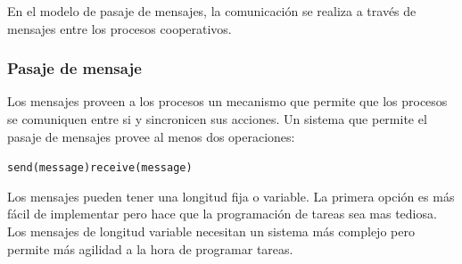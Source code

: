 En el modelo de pasaje de mensajes, la comunicación se realiza a través de mensajes entre los procesos cooperativos.

\subsubsection{Pasaje de mensaje}
Los mensajes proveen a los procesos un mecanismo que permite que los procesos se comuniquen entre si y sincronicen sus acciones. Un sistema que permite el pasaje de mensajes provee al menos dos operaciones:
\begin{center}
	\texttt{send(message)}\hspace*{1cm}\texttt{receive(message)}
\end{center}

Los mensajes pueden tener una longitud fija o variable. La primera opción es más fácil de implementar pero hace que la programación de tareas sea mas tediosa. Los mensajes de longitud variable necesitan un sistema más complejo pero permite más agilidad a la hora de programar tareas.

